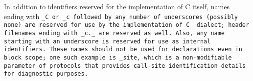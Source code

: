 In addition to identifiers reserved for the implementation of C itself,
names ending with \tt{_C} or \tt{_c} followed by any number of underscores
(possibly none) are reserved for use by the implementation of C\_ dialect;
header filenames ending with \tt{_c._} are reserved as well.
Also, any name starting with an underscore is
reserved for use as internal identifiers.
These names should not be used for declarations even in block scope;
one such example is \tt{_site}, which is a non-modifiable parameter of protocols
that provides call-site identification details for diagnostic purposes.
